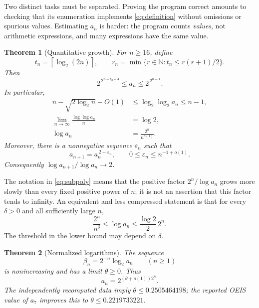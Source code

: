 \documentclass[11pt,a4paper]{article}
\newtheorem{theorem}{Theorem}[section]
\theoremstyle{definition}
\theoremstyle{remark}
\newcommand{\NN}{\mathbb{N}}
\renewcommand{\lg}{\log_2}
\newcommand{\ceil}[1]{\left\lceil #1\right\rceil}
\begin{document}
Two distinct tasks must be separated. Proving the program correct amounts
to checking that its enumeration implements \eqref{eq:definition} without
omissions or spurious values. Estimating $a_n$ is harder: the program
counts \emph{values}, not arithmetic expressions, and many expressions
have the same value.

\begin{theorem}[Quantitative growth]\label{thm:main}
For $n\ge16$, define
\[
 t_n=\ceil{\lg(2n)},\qquad
 r_n=\min\{r\in\NN:t_n\le r(r+1)/2\}.
\]
Then
\begin{equation}\label{eq:explicit-main}
 \boxed{\quad 2^{\,2^{n-r_n-4}}\le a_n\le2^{\,2^{n-1}}.\quad}
\end{equation}
In particular,
\begin{align}
 n-\sqrt{2\lg n}-O(1)&\le \lg\lg a_n\le n-1,\label{eq:doublelog}\\
 \lim_{n\to\infty}\frac{\log\log a_n}{n}&=\log2,\label{eq:limit-main}\\
 \log a_n&=\frac{2^n}{n^{o(1)}}.\label{eq:subpoly}
\end{align}
Moreover, there is a nonnegative sequence $\varepsilon_n$ such that
\begin{equation}\label{eq:local-main}
 a_{n+1}=a_n^{\,2-\varepsilon_n},\qquad
 0\le\varepsilon_n\le n^{-1+o(1)}.
\end{equation}
Consequently $\log a_{n+1}/\log a_n\to2$.
\end{theorem}

The notation in \eqref{eq:subpoly} means that the positive factor
$2^n/\log a_n$ grows more slowly than every fixed positive power of $n$;
it is not an assertion that this factor tends to infinity.
An equivalent and less compressed statement is that for every $\delta>0$
and all sufficiently large $n$,
\[
 \frac{2^n}{n^\delta}\le\log a_n\le\frac{\log2}{2}\,2^n.
\]
The threshold in the lower bound may depend on $\delta$.

\begin{theorem}[Normalized logarithms]\label{thm:entropy-intro}
The sequence
\[
 \beta_n=2^{-n}\lg a_n\qquad(n\ge1)
\]
is nonincreasing and has a limit $\theta\ge0$. Thus
\begin{equation}\label{eq:theta-form}
 a_n=2^{(\theta+o(1))2^n}.
\end{equation}
The independently recomputed data imply
$\theta\le0.2505464198$; the reported OEIS value of $a_7$ improves this to
$\theta\le0.2219733221$.
\end{theorem}
\end{document}

